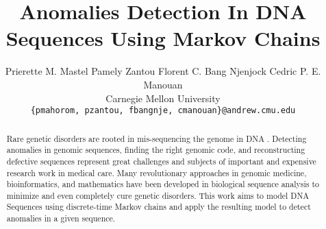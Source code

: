 \documentclass[10pt,twocolumn,letterpaper]{article}
\begin{document}
    
\title{Anomalies Detection In DNA Sequences Using Markov Chains}

\author{Prierette M. Mastel \quad Pamely Zantou \quad Florent C. Bang Njenjock \quad Cedric P. E. Manouan \\
Carnegie Mellon University\\
{\tt\small \{pmahorom, pzantou, fbangnje, cmanouan\}@andrew.cmu.edu}
}

\maketitle
\thispagestyle{empty}

\begin{abstract}
    Rare genetic disorders are rooted in mis-sequencing the
    genome in DNA \cite{posey}. Detecting anomalies in genomic sequences, finding the right genomic code, and reconstructing
    defective sequences represent great challenges and subjects
    of important and expensive research work in medical care.
    Many revolutionary approaches in genomic medicine, bioinformatics, and mathematics have been developed in biological
    sequence analysis to minimize and even completely cure
    genetic disorders. This work aims to model DNA Sequences
    using discrete-time Markov chains and apply the resulting model to detect anomalies in a given sequence.
\end{abstract}


\end{document}

